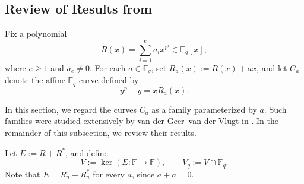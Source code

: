 \documentclass[12pt,a4paper]{amsart}
\theoremstyle{definition}
\def\F{{\mathbb F}}
\theoremstyle{remark}
\begin{document}
\subsection{Review of Results from \cite{GV}}
\label{notation_twist}
Fix a polynomial 
\[R(x)=\sum_{i=1}^ea_ix^{p^i}\in \F_q[x],\]
where $e\geq1$ and $ a_e\neq0$.  For each $a\in \F_q$, set $R_a(x):=R(x)+ax$, and let $C_a$ denote the affine $\F_q$-curve defined by 
\begin{equation}\label{GVCa}
 y^p - y = x R_a(x). 
 \end{equation}

In this section, we regard the curves $C_a$ as a family  parameterized by $a$. Such families were studied extensively by van der Geer--van der Vlugt in \cite{GV}. In the remainder of this subsection, we review their results. 



Let $E:=R+R^\ast$, and define  
\[V:=\ker(E\colon \F\to \F),\qquad V_{q}:=V\cap \F_q. \]
Note that $E=R_a+R_a^\ast$ for every $a$, since $a+a=0$. 
\end{document}
